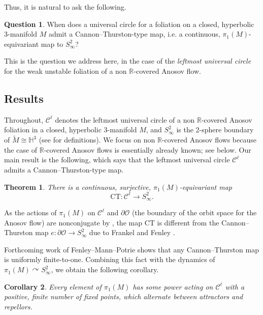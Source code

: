 \documentclass[11pt]{amsart}
\newcommand{\HH}[0]{\mathbb{H}}
\newcommand{\R}{\mathbb{R}}
\newcommand{\wt}{\widetilde}
\newcommand{\mc}{\mathcal}
\newcommand{\orb}{\mathcal{O}}
\newcommand{\ct}{\mathrm{CT}}
\numberwithin{equation}{section}
\newtheorem{thm}{Theorem}
\newtheorem{cor}[thm]{Corollary}
\theoremstyle{definition}
\newtheorem{question}[equation]{Question}
\begin{document}
Thus, it is natural to ask the following.

\begin{question}\label{q:main}
	When does a universal circle for a foliation on a closed, hyperbolic 3-manifold $M$ admit a Cannon--Thurston-type map, i.e. a continuous, $\pi_1(M)$-equivariant map to $S^2_\infty$?
\end{question}

This is the question we address here, in the case of the \emph{leftmost universal circle} for the weak unstable foliation of a non $\R$-covered Anosov flow.

\subsection*{Results}
Throughout, $\mc C^\ell$ denotes the leftmost universal circle of a non $\R$-covered Anosov foliation in a closed, hyperbolic 3-manifold $M$, and $S^2_\infty$ is the 2-sphere boundary of $\wt M\cong\HH^3$ (see  for definitions). We focus on non $\R$-covered Anosov flows because the case of $\R$-covered Anosov flows is essentially already known; see below. Our main result is the following, which says that the leftmost universal circle $\mc C^\ell$ admits a Cannon--Thurston-type map.

\begin{thm}\label{thma:ct}
	There is a continuous, surjective, $\pi_1(M)$-equivariant map
	\[
	\ct\colon\mc C^\ell\to S^2_\infty.
	\]

\end{thm}

As the actions of $\pi_1(M)$ on $\mc C^\ell$ and $\partial\orb$ (the boundary of the orbit space for the Anosov flow) are nonconjugate by \cite[Theorem B]{buckminster2025universal}, the map $\ct$ is different from the Cannon--Thurston map $e\colon\partial\orb\to S^2_\infty$ due to Frankel \cite{Frankel_thesis} and Fenley \cite{fenley2022nonrcoveredanosovflows}.

Forthcoming work of Fenley--Mann--Potrie \cite{FMP} shows that any Cannon--Thurston map is uniformly finite-to-one. Combining this fact with the dynamics of $\pi_1(M)\curvearrowright S^2_\infty$, we obtain the following corollary.

\begin{cor}\label{cor:dyn}
	Every element of $\pi_1(M)$ has some power acting on $\mc C^\ell$ with a positive, finite number of fixed points, which alternate between attractors and repellors.
\end{cor}
\end{document}
